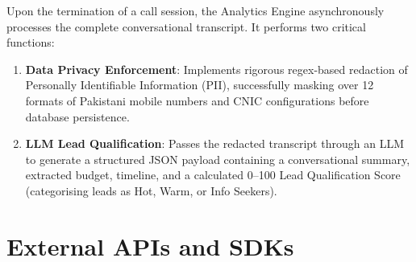 Upon the termination of a call session, the Analytics Engine asynchronously processes the complete conversational transcript. It performs two critical functions:
\begin{enumerate}
    \item \textbf{Data Privacy Enforcement}: Implements rigorous regex-based redaction of Personally Identifiable Information (PII), successfully masking over 12 formats of Pakistani mobile numbers and CNIC configurations before database persistence.
    \item \textbf{LLM Lead Qualification}: Passes the redacted transcript through an LLM to generate a structured JSON payload containing a conversational summary, extracted budget, timeline, and a calculated 0--100 Lead Qualification Score (categorising leads as Hot, Warm, or Info Seekers).
\end{enumerate}

\section{External APIs and SDKs}

